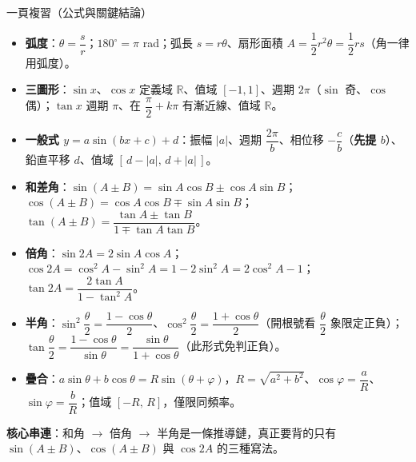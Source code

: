 \documentclass[11pt]{article}
\begin{document}
\begin{補充框}{一頁複習（公式與關鍵結論）}
\begin{itemize}\setlength{\itemsep}{2pt}
\item \textbf{弧度}：$\theta=\dfrac{s}{r}$；$180^\circ=\pi$ rad；弧長 $s=r\theta$、扇形面積 $A=\dfrac12 r^2\theta=\dfrac12 rs$（角一律用弧度）。
\item \textbf{三圖形}：$\sin x$、$\cos x$ 定義域 $\mathbb{R}$、值域 $[-1,1]$、週期 $2\pi$（$\sin$ 奇、$\cos$ 偶）；$\tan x$ 週期 $\pi$、在 $\dfrac{\pi}{2}+k\pi$ 有漸近線、值域 $\mathbb{R}$。
\item \textbf{一般式 $y=a\sin(bx+c)+d$}：振幅 $|a|$、週期 $\dfrac{2\pi}{b}$、相位移 $-\dfrac{c}{b}$（\textbf{先提 $b$}）、鉛直平移 $d$、值域 $[\,d-|a|,\,d+|a|\,]$。
\item \textbf{和差角}：$\sin(A\pm B)=\sin A\cos B\pm\cos A\sin B$；$\cos(A\pm B)=\cos A\cos B\mp\sin A\sin B$；$\tan(A\pm B)=\dfrac{\tan A\pm\tan B}{1\mp\tan A\tan B}$。
\item \textbf{倍角}：$\sin2A=2\sin A\cos A$；$\cos2A=\cos^2A-\sin^2A=1-2\sin^2A=2\cos^2A-1$；$\tan2A=\dfrac{2\tan A}{1-\tan^2A}$。
\item \textbf{半角}：$\sin^2\dfrac{\theta}{2}=\dfrac{1-\cos\theta}{2}$、$\cos^2\dfrac{\theta}{2}=\dfrac{1+\cos\theta}{2}$（開根號看 $\dfrac{\theta}{2}$ 象限定正負）；$\tan\dfrac{\theta}{2}=\dfrac{1-\cos\theta}{\sin\theta}=\dfrac{\sin\theta}{1+\cos\theta}$（此形式免判正負）。
\item \textbf{疊合}：$a\sin\theta+b\cos\theta=R\sin(\theta+\varphi)$，$R=\sqrt{a^2+b^2}$、$\cos\varphi=\dfrac{a}{R}$、$\sin\varphi=\dfrac{b}{R}$；值域 $[-R,\,R]$，僅限同頻率。
\end{itemize}
\textbf{核心串連}：和角 $\rightarrow$ 倍角 $\rightarrow$ 半角是一條推導鏈，真正要背的只有 $\sin(A\pm B)$、$\cos(A\pm B)$ 與 $\cos2A$ 的三種寫法。
\end{補充框}
\end{document}
